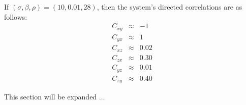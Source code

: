 \documentclass[a4paper,11pt]{article}
\begin{document}
If $(\sigma,\beta,\rho)=(10,0.01,28)$, then the system's directed correlations are as follows:
\begin{eqnarray*}
C_{xy} &\approx & -1\\
C_{yx} &\approx & 1\\
C_{xz} &\approx & 0.02\\
C_{zx} &\approx & 0.30\\
C_{yz} &\approx & 0.01\\
C_{zy} &\approx & 0.40
\end{eqnarray*}

This section will be expanded $\ldots$
\end{document}
